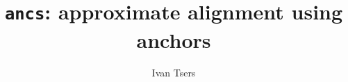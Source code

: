 \documentclass[a4paper]{article}
\begin{document}
\pagestyle{noweb}

\title{\texttt{ancs}: approximate alignment using anchors}
\author{Ivan Tsers}
\maketitle
\tableofcontents






\end{document}
